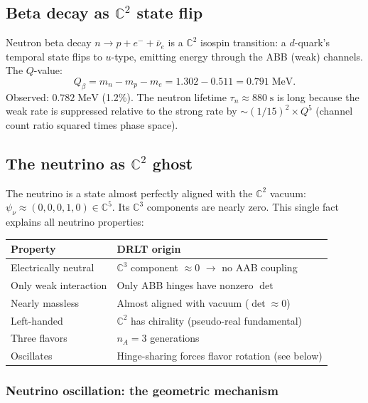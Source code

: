 \subsection{Beta decay as $\mathbb{C}^2$ state flip}

Neutron beta decay $n \to p + e^- + \bar{\nu}_e$ is a $\mathbb{C}^2$ isospin transition: a $d$-quark's temporal state flips to $u$-type, emitting energy through the ABB (weak) channels. The $Q$-value:
\begin{equation}
Q_\beta = m_n - m_p - m_e = 1.302 - 0.511 = 0.791\;\text{MeV}.
\end{equation}
Observed: $0.782\;\text{MeV}$ (1.2\%). The neutron lifetime $\tau_n \approx 880\;\text{s}$ is long because the weak rate is suppressed relative to the strong rate by $\sim(1/15)^2 \times Q^5$ (channel count ratio squared times phase space).

\subsection{The neutrino as $\mathbb{C}^2$ ghost}

The neutrino is a state almost perfectly aligned with the $\mathbb{C}^2$ vacuum: $\psi_\nu \approx (0, 0, 0, 1, 0) \in \mathbb{C}^5$. Its $\mathbb{C}^3$ components are nearly zero. This single fact explains all neutrino properties:

\begin{center}
\begin{tabular}{ll}
\hline
Property & DRLT origin \\
\hline
Electrically neutral & $\mathbb{C}^3$ component $\approx 0$ $\to$ no AAB coupling \\
Only weak interaction & Only ABB hinges have nonzero $\det$ \\
Nearly massless & Almost aligned with vacuum ($\det \approx 0$) \\
Left-handed & $\mathbb{C}^2$ has chirality (pseudo-real fundamental) \\
Three flavors & $n_A = 3$ generations \\
Oscillates & Hinge-sharing forces flavor rotation (see below) \\
\hline
\end{tabular}
\end{center}

\subsubsection{Neutrino oscillation: the geometric mechanism}

